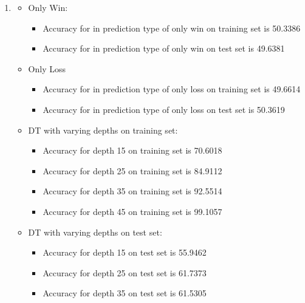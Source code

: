 \begin{enumerate}[label=(\alph*)]
          \begin{enumerate}[label=\roman*.]
              \item
                    \begin{itemize}
                        \item Only Win:
                              \begin{itemize}
                                  \item Accuracy for in prediction type of only win on training set is 50.3386
                                  \item Accuracy for in prediction type of only win on test set is 49.6381
                              \end{itemize}
                        \item Only Loss
                              \begin{itemize}
                                  \item Accuracy for in prediction type of only loss on training set is 49.6614
                                  \item Accuracy for in prediction type of only loss on test set is 50.3619
                              \end{itemize}
                        \item DT with varying depths on training set:
                              \begin{itemize}
                                  \item Accuracy for depth 15 on training set is 70.6018
                                  \item Accuracy for depth 25 on training set is 84.9112
                                  \item Accuracy for depth 35 on training set is 92.5514
                                  \item Accuracy for depth 45 on training set is 99.1057
                              \end{itemize}
                        \item DT with varying depths on test set:
                              \begin{itemize}
                                  \item Accuracy for depth 15 on test set is 55.9462
                                  \item Accuracy for depth 25 on test set is 61.7373
                                  \item Accuracy for depth 35 on test set is 61.5305

\end{itemize}
\end{itemize}
\end{enumerate}
\end{enumerate}
